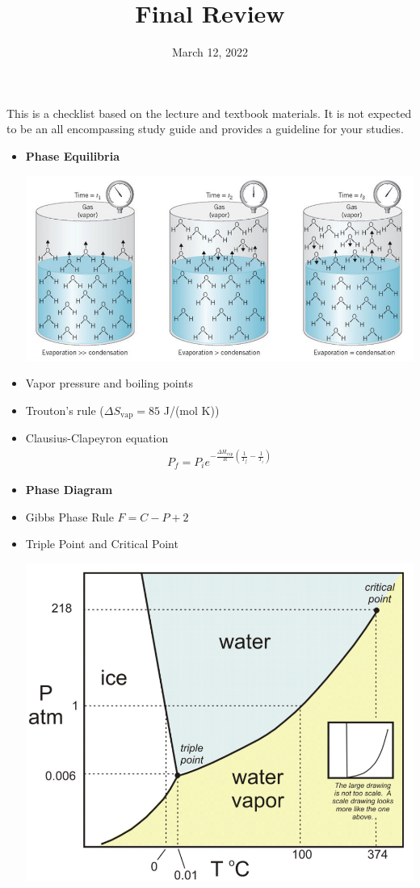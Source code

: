 \documentclass[11pt]{article}
\title{\textbf{Final Review}}
\date{\vspace{-2em}March 12, 2022}
\begin{document}
\maketitle

This is a checklist based on the lecture and textbook materials. It is not
expected to be an all encompassing study guide and provides a guideline for
your studies.

\begin{itemize}
\item[] \textbf{Phase Equilibria}
  \begin{center}
    \includegraphics[scale=0.35]{vapor.png}
  \end{center}
\item Vapor pressure and boiling points
\item Trouton's rule ($\Delta S_\text{vap} = 85$ J/(mol K))
\item Clausius-Clapeyron equation
  \begin{align*}
    P_f = P_i e^{-\frac{\Delta H_\text{vap}}{R}(\frac{1}{T_f}-\frac{1}{T_i})}
  \end{align*}
\item[] \textbf{Phase Diagram}
\item Gibbs Phase Rule $F = C - P + 2$
\item Triple Point and Critical Point
  \begin{center}
    \includegraphics[scale=0.3]{water_phase.png}

\end{center}
\end{itemize}
\end{document}
